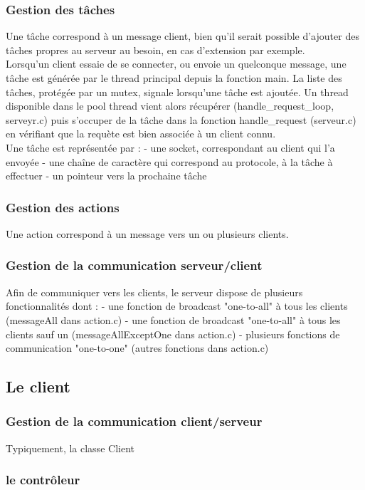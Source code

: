 \documentclass[11pt]{article}
\begin{document}
\subsubsection{Gestion des tâches}
Une tâche correspond à un message client, bien qu'il serait possible d'ajouter des tâches propres au serveur au besoin, en cas d'extension par exemple.\\
Lorsqu'un client essaie de se connecter, ou envoie un quelconque message, une tâche est générée par le thread principal depuis la fonction main. La liste des tâches, protégée par un mutex, signale lorsqu'une tâche est ajoutée. Un thread disponible dans le pool thread vient alors récupérer (handle\_request\_loop, serveyr.c) puis s'occuper de la tâche dans la fonction handle\_request (serveur.c) en vérifiant que la requète est bien associée à un client connu.\\
Une tâche est représentée par :
- une socket, correspondant au client qui l'a envoyée
- une chaîne de caractère qui correspond au protocole, à la tâche à effectuer
- un pointeur vers la prochaine tâche
\subsubsection{Gestion des actions}
Une action correspond à un message vers un ou plusieurs clients.
\subsubsection{Gestion de la communication serveur/client}
Afin de communiquer vers les clients, le serveur dispose de plusieurs fonctionnalités dont :
- une fonction de broadcast "one-to-all" à tous les clients (messageAll dans action.c)
- une fonction de broadcast "one-to-all" à tous les clients sauf un (messageAllExceptOne dans action.c)
- plusieurs fonctions de communication "one-to-one" (autres fonctions dans action.c)



\subsection{Le client}
\subsubsection{Gestion de la communication client/serveur}
Typiquement, la classe Client
\subsubsection{le contrôleur}
\end{document}
